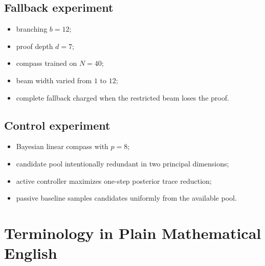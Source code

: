 \documentclass[11pt]{article}
\begin{document}
\subsection{Fallback experiment}
\begin{itemize}
\item branching \(b=12\);
\item proof depth \(d=7\);
\item compass trained on \(N=40\);
\item beam width varied from \(1\) to \(12\);
\item complete fallback charged when the restricted beam loses the proof.
\end{itemize}

\subsection{Control experiment}
\begin{itemize}
\item Bayesian linear compass with \(p=8\);
\item candidate pool intentionally redundant in two principal dimensions;
\item active controller maximizes one-step posterior trace reduction;
\item passive baseline samples candidates uniformly from the available pool.
\end{itemize}

\section{Terminology in Plain Mathematical English}
\end{document}
